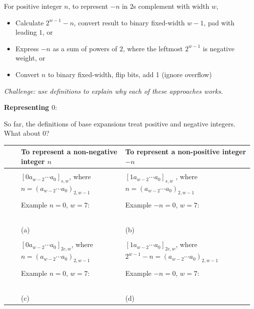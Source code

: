 \documentclass[12pt, oneside]{article}
\begin{document}
For positive integer $n$, to represent $-n$ in 
$2$s complement with width $w$,
\begin{itemize}
    \item Calculate $2^{w-1} - n$, convert 
    result to binary fixed-width $w-1$, pad 
    with leading $1$, or
    \item Express $-n$ as a sum of powers of $2$, 
    where the leftmost $2^{w-1}$ is negative weight, or
    \item Convert $n$ to binary fixed-width, 
    flip bits, add 1 (ignore overflow)
\end{itemize}

{\it Challenge: use definitions to explain why
each of these approaches works.} 

{\bf Representing $0$}:

So far, the definitions of base expansions treat
positive and negative integers. What about $0$?

\begin{tabular}{|cc|p{3.4in}|p{3.7in}|}
   \hline
   & & To  represent a {\bf non-negative} integer $n$ & To represent a {\bf non-positive} integer $-n$\\
   \hline
   && &  \\
   &\parbox[t]{2mm}{} &
   $[ 0a_{w-2} \cdots a_0]_{s,w}$, where $n =  (a_{w-2} \cdots a_0)_{2,w-1}$& 
   $[1a_{w-2} \cdots a_0]_{s,w}$
   , where $n =  (a_{w-2} \cdots a_0)_{2,w-1}$\\
   && & \\
   && Example $n=0$, $w=7$:  & Example $-n=0$, $w=7$: \\
   && & \\
   && & \\
   && & \\
   && & \\
   && & \\
   && (a) & (b)\\
   \hline
   &&  &  \\
   &\parbox[t]{2mm}{} &
   $[0a_{w-2} \cdots a_0]_{2c,w}$, where $n =  (a_{w-2} \cdots a_0)_{2,w-1}$& $[1a_{w-2} \cdots a_0]_{2c,w}$, where $2^{w-1} - n =  (a_{w-2} \cdots a_0)_{2,w-1}$\\
   && & \\
   && Example $n=0$, $w=7$:  & Example $-n=0$, $w=7$: \\
   && & \\
   && & \\
   && & \\
   && & \\
   && & \\
   && (c) & (d) \\
   \hline
\end{tabular} \newpage
\end{document}
